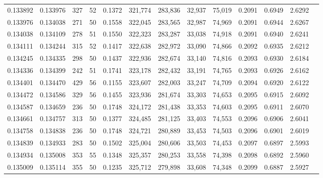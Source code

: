 \begin{tabular}{rrrrrrrrrrrrr}
0.133892 & 0.133976 &   327 &  52 &                                     0.1372 & 321,774 & 283,836 &  32,937 &  75,019 & 0.2091 & 0.6949 & 2.6292 \\
0.133976 & 0.134038 &   271 &  50 &                                     0.1558 & 322,045 & 283,565 &  32,987 &  74,969 & 0.2091 & 0.6944 & 2.6267 \\
0.134038 & 0.134109 &   278 &  51 &                                     0.1550 & 322,323 & 283,287 &  33,038 &  74,918 & 0.2091 & 0.6940 & 2.6241 \\
0.134111 & 0.134244 &   315 &  52 &                                     0.1417 & 322,638 & 282,972 &  33,090 &  74,866 & 0.2092 & 0.6935 & 2.6212 \\
0.134245 & 0.134335 &   298 &  50 &                                     0.1437 & 322,936 & 282,674 &  33,140 &  74,816 & 0.2093 & 0.6930 & 2.6184 \\
0.134336 & 0.134399 &   242 &  51 &                                     0.1741 & 323,178 & 282,432 &  33,191 &  74,765 & 0.2093 & 0.6926 & 2.6162 \\
0.134401 & 0.134470 &   429 &  56 &                                     0.1155 & 323,607 & 282,003 &  33,247 &  74,709 & 0.2094 & 0.6920 & 2.6122 \\
0.134472 & 0.134586 &   329 &  56 &                                     0.1455 & 323,936 & 281,674 &  33,303 &  74,653 & 0.2095 & 0.6915 & 2.6092 \\
0.134587 & 0.134659 &   236 &  50 &                                     0.1748 & 324,172 & 281,438 &  33,353 &  74,603 & 0.2095 & 0.6911 & 2.6070 \\
0.134661 & 0.134757 &   313 &  50 &                                     0.1377 & 324,485 & 281,125 &  33,403 &  74,553 & 0.2096 & 0.6906 & 2.6041 \\
0.134758 & 0.134838 &   236 &  50 &                                     0.1748 & 324,721 & 280,889 &  33,453 &  74,503 & 0.2096 & 0.6901 & 2.6019 \\
0.134839 & 0.134933 &   283 &  50 &                                     0.1502 & 325,004 & 280,606 &  33,503 &  74,453 & 0.2097 & 0.6897 & 2.5993 \\
0.134934 & 0.135008 &   353 &  55 &                                     0.1348 & 325,357 & 280,253 &  33,558 &  74,398 & 0.2098 & 0.6892 & 2.5960 \\
0.135009 & 0.135114 &   355 &  50 &                                     0.1235 & 325,712 & 279,898 &  33,608 &  74,348 & 0.2099 & 0.6887 & 2.5927 \\

\end{tabular}

